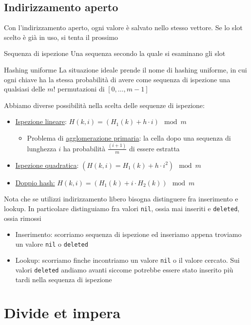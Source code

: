 \subsection{Indirizzamento aperto}
Con l'indirizzamento aperto, ogni valore è salvato nello stesso vettore. Se lo slot scelto è già in uso, si tenta il prossimo
\vskip3mm
\begin{definizione}{Sequenza di ispezione}
	Una sequenza secondo la quale si esaminano gli slot
\end{definizione}
\begin{definizione}{Hashing uniforme}
	La situazione ideale prende il nome di hashing uniforme, in cui ogni
	chiave ha la stessa probabilità di avere come sequenza di ispezione
	una qualsiasi delle $ m! $ permutazioni di $ [0,\ldots  , m - 1] $
\end{definizione}
Abbiamo diverse possibilità nella scelta delle sequenze di ispezione:
\begin{itemize}
	\item \underline{Ispezione lineare}: $ H(k, i) = (H_1(k) +  h \cdot i) \mod m $
	      \begin{itemize}
		      \item Problema di \underline{agglomerazione primaria}: la cella dopo una sequenza di lunghezza $ i $ ha probabilità $ \frac{\left(i+1\right)}{m} $ di essere estratta
	      \end{itemize}
	\item \underline{Ispezione quadratica}: $ \left(H\left(k,i\right) = H_1\left(k\right) + h \cdot i^2  \right) \mod  m$
	\item \underline{Doppio hash:} $ H(k, i) = (H_1(k) + i \cdot H_2(k)) \mod m $
\end{itemize}
Nota che se utilizzi indirizzamento libero bisogna distinguere fra  inserimento e lookup. In particolare distinguiamo fra valori \verb|nil|, ossia mai inseriti e \verb|deleted|, ossia rimossi
\begin{itemize}
	\item Inserimento: scorriamo sequenza di ispezione ed inseriamo appena troviamo un valore \verb|nil| o \verb|deleted|
	\item Lookup: scorriamo finche incontriamo un valore \verb|nil| o il valore cercato. Sui valori \verb|deleted| andiamo avanti siccome potrebbe essere stato inserito più tardi nella sequenza di ispezione
\end{itemize}

\section{Divide et impera}
